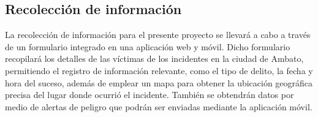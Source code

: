 \subsection{Recolección de información}
La recolección de información para el presente proyecto se llevará a cabo a través de un
formulario integrado en una aplicación web y móvil. Dicho formulario recopilará los detalles
de las víctimas de los incidentes en la ciudad de Ambato, permitiendo el registro de
información relevante, como el tipo de delito, la fecha y hora del suceso, además de
emplear un mapa para obtener la ubicación geográfica precisa del lugar donde ocurrió el
incidente. También se obtendrán datos por medio de alertas de peligro que podrán ser enviadas
mediante la aplicación móvil.